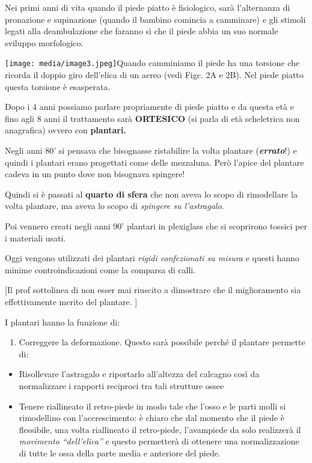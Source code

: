 \documentclass[]{article}
\begin{document}
Nei primi anni di vita quando il piede piatto è fisiologico, sarà
l'alternanza di pronazione e supinazione (quando il bambino comincia a
camminare) e gli stimoli legati alla deambulazione che faranno sì che il
piede abbia un suo normale sviluppo morfologico.

\texttt{[image: media/image3.jpeg]}Quando
camminiamo il piede ha una torsione che ricorda il doppio giro
dell'elica di un aereo (vedi Figc. 2A e 2B). Nel piede piatto questa
torsione è esasperata.

Dopo i 4 anni possiamo parlare propriamente di piede piatto e da questa
età e fino agli 8 anni il trattamento sarà \textbf{ORTESICO} (si parla
di età scheletrica non anagrafica) ovvero con \textbf{plantari.}

Negli anni 80' si pensava che bisognasse ristabilire la volta plantare
(\textbf{\emph{errato}}!) e quindi i plantari erano progettati come
delle mezzaluna. Però l'apice del plantare cadeva in un punto dove non
bisognava spingere!

Quindi si è passati al \textbf{quarto di sfera} che non aveva lo scopo
di rimodellare la volta plantare, ma aveva lo scopo di \emph{spingere su
l'astragalo}.

Poi vennero creati negli anni 90' plantari in plexiglass che si
scoprirono tossici per i materiali usati.

Oggi vengono utilizzati dei plantari \emph{rigidi confezionati su
misura} e questi hanno minime controindicazioni come la comparsa di
calli.

{[}Il prof sottolinea di non esser mai riuscito a dimostrare che il
miglioramento sia effettivamente merito del plantare. {]}

I plantari hanno la funzione di:

\begin{enumerate}
\def\labelenumi{\arabic{enumi}.}
\item
  Correggere la deformazione. Questo sarà possibile perché il plantare
  permette di:
\end{enumerate}

\begin{itemize}
\item
  Risollevare l'astragalo e riportarlo all'altezza del calcagno così da
  normalizzare i rapporti reciproci tra tali strutture ossee
\item
  Tenere riallineato il retro-piede in modo tale che l'osso e le parti
  molli si rimodellino con l'accrescimento: è chiaro che dal momento che
  il piede è flessibile, una volta riallineato il retro-piede,
  l'avampiede da solo realizzerà il \emph{movimento ``dell'elica''} e
  questo permetterà di ottenere una normalizzazione di tutte le ossa
  della parte media e anteriore del piede.
\end{itemize}
\end{document}
